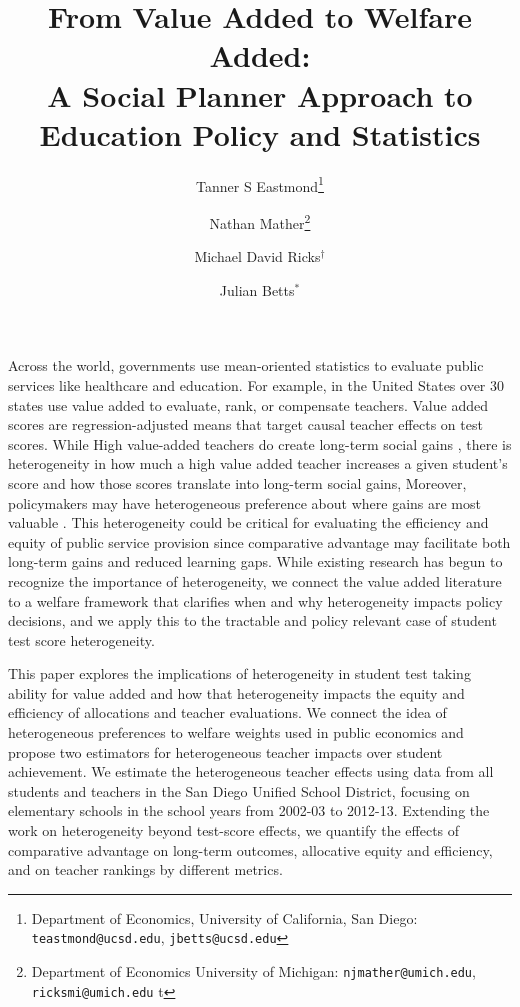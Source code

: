 \documentclass{article}
\title{From Value Added to Welfare Added: \\ A Social Planner Approach to Education Policy and Statistics}
\author{Tanner S Eastmond\thanks{Department of Economics, University of California, San Diego: \texttt{teastmond@ucsd.edu}, \texttt{jbetts@ucsd.edu}} \and Nathan Mather\thanks{Department of Economics University of Michigan: \texttt{njmather@umich.edu}, \texttt{ricksmi@umich.edu} \hspace{11em} {\color{white}t}} \and Michael David Ricks$^\dagger$ \and Julian Betts$^*$}
\theoremstyle{definition}
\theoremstyle{definition}
\theoremstyle{definition}
\theoremstyle{definition}
\begin{document}
\maketitle




Across the world, governments use mean-oriented statistics to evaluate public services like healthcare and education. For example, in the United States over 30 states use value added to evaluate, rank, or compensate teachers.
Value added scores are regression-adjusted means that target causal teacher effects on test scores. While High value-added teachers do create long-term social gains \citep[e.g.,][]{chetty2014measuring2,pope2017multidimensional}, there is heterogeneity in how much a high value added teacher increases a given student's score and how those scores translate into long-term social gains, \citep[as in][etc.]{Delgado2020,bates2022teacher} Moreover, policymakers may have heterogeneous preference about where gains are most valuable \citep[such as No Child Left Behind, see][]{neal2010left}. This heterogeneity could be critical for evaluating the efficiency and equity of public service provision since comparative advantage may facilitate both long-term gains and reduced learning gaps. While existing research has begun to recognize the importance of heterogeneity, we connect the value added literature to a welfare framework that clarifies when and why heterogeneity impacts policy decisions, and we apply this to the tractable and policy relevant case of student test score heterogeneity.
    

This paper explores the implications of heterogeneity in student test taking ability for value added and how that heterogeneity impacts the equity and efficiency of allocations and teacher evaluations. We connect the idea of heterogeneous preferences to welfare weights used in public economics and propose two estimators for heterogeneous teacher impacts over student achievement. We estimate the heterogeneous teacher effects using data from all students and teachers in the San Diego Unified School District, focusing on elementary schools in the school years from 2002-03 to 2012-13. Extending the work on heterogeneity beyond test-score effects, we quantify the effects of comparative advantage on long-term outcomes, allocative equity and efficiency, and on teacher rankings by different metrics.
\end{document}
